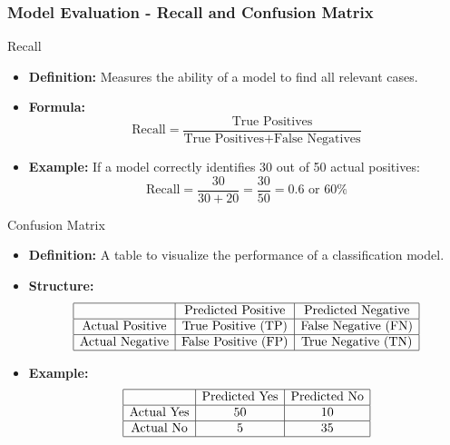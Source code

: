 \documentclass[aspectratio=169]{beamer}
\begin{document}
\begin{frame}[fragile]
    \frametitle{Model Evaluation - Recall and Confusion Matrix}
    \begin{block}{Recall}
        \begin{itemize}
            \item \textbf{Definition:} Measures the ability of a model to find all relevant cases.
            \item \textbf{Formula:}
            \[
            \text{Recall} = \frac{\text{True Positives}}{\text{True Positives} + \text{False Negatives}}
            \]
            \item \textbf{Example:} If a model correctly identifies 30 out of 50 actual positives:
            \[
            \text{Recall} = \frac{30}{30 + 20} = \frac{30}{50} = 0.6 \text{ or } 60\%
            \]
        \end{itemize}
    \end{block}

    \begin{block}{Confusion Matrix}
        \begin{itemize}
            \item \textbf{Definition:} A table to visualize the performance of a classification model.
            \item \textbf{Structure:}
            \[
            \begin{array}{|c|c|c|}
            \hline
            & \text{Predicted Positive} & \text{Predicted Negative} \\
            \hline
            \text{Actual Positive} & \text{True Positive (TP)} & \text{False Negative (FN)} \\
            \hline
            \text{Actual Negative} & \text{False Positive (FP)} & \text{True Negative (TN)} \\
            \hline
            \end{array}
            \]
            \item \textbf{Example:}
            \[
            \begin{array}{|c|c|c|}
            \hline
            & \text{Predicted Yes} & \text{Predicted No} \\
            \hline
            \text{Actual Yes} & 50 & 10 \\
            \hline
            \text{Actual No} & 5 & 35 \\
            \hline
            \end{array}
            \]
        \end{itemize}
    \end{block}
\end{frame}
\end{document}
